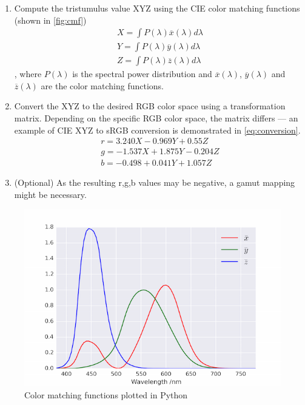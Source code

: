 \begin{enumerate}
	\item Compute the tristumulus value XYZ using the CIE color matching functions (shown in \autoref{fig:cmf})
	\begin{align*} 
	X=\int P(\lambda)\overline{x}(\lambda)d\lambda\\
	Y=\int P(\lambda)\overline{y}(\lambda)d\lambda\\
	Z=\int P(\lambda)\overline{z}(\lambda)d\lambda
	\end{align*} 
	, where $P(\lambda)$ is the spectral power distribution and $\overline{x}(\lambda)$, $\overline{y}(\lambda)$ and $\overline{z}(\lambda)$ are the color matching functions.
	\item Convert the XYZ to the desired RGB color space using a transformation matrix. Depending on the specific RGB color space, the matrix differs --- an example of CIE XYZ to sRGB conversion is demonstrated in \autoref{eq:conversion}.
	\begin{align*}  
	r=3.240X-0.969Y+0.55Z\\
	g=-1.537X+1.875Y-0.204Z\\
	b=-0.498+0.041Y+1.057Z
	\end{align*}\label{eq:conversion}
	\item (Optional) As the resulting r,g,b values may be negative, a gamut mapping might be necessary.
\end{enumerate}

\begin{figure}[httpb]
	\centering
	\includegraphics[width=.8\linewidth]{img/cmf.png}
	\caption[CMF]{Color matching functions plotted in Python\footnotemark}
	\label{fig:cmf}
\end{figure}

